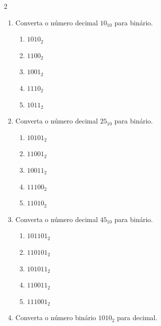 \documentclass[a4paper,12pt]{article}
\begin{document}
\begin{multicols}{2}
\raggedcolumns

\begin{enumerate}[leftmargin=*]


\item Converta o número decimal $10_{10}$ para binário.

\begin{enumerate}[label=(\Alph*)]
    \item $1010_2$
    \item $1100_2$
    \item $1001_2$
    \item $1110_2$
    \item $1011_2$
\end{enumerate}

\vspace{0.2cm}

\item Converta o número decimal $25_{10}$ para binário.

\begin{enumerate}[label=(\Alph*)]
    \item $10101_2$
    \item $11001_2$
    \item $10011_2$
    \item $11100_2$
    \item $11010_2$
\end{enumerate}

\vspace{0.2cm}

\item Converta o número decimal $45_{10}$ para binário.

\begin{enumerate}[label=(\Alph*)]
    \item $101101_2$
    \item $110101_2$
    \item $101011_2$
    \item $110011_2$
    \item $111001_2$
\end{enumerate}

\vspace{0.2cm}

\item Converta o número binário $1010_2$ para decimal.


\end{enumerate}
\end{multicols}
\end{document}
